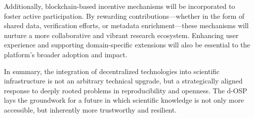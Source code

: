 \documentclass[final]{rc-book-2.14}
\begin{document}
Additionally, blockchain-based incentive mechanisms will be incorporated to foster active participation. By rewarding contributions—whether in the form of shared data, verification efforts, or metadata enrichment—these mechanisms will nurture a more collaborative and vibrant research ecosystem. Enhancing user experience and supporting domain-specific extensions will also be essential to the platform’s broader adoption and impact.

In summary, the integration of decentralized technologies into scientific infrastructure is not an arbitrary technical upgrade, but a strategically aligned response to deeply rooted problems in reproducibility and openness. The d-OSP lays the groundwork for a future in which scientific knowledge is not only more accessible, but inherently more trustworthy and resilient.


\backmatter



\end{document}
